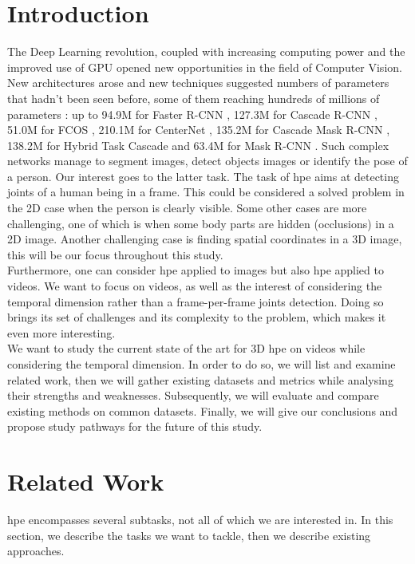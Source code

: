 \documentclass[runningheads]{llncs}
\begin{document}
\section{Introduction}
\label{section: introduction}
The Deep Learning revolution, coupled with increasing computing power and the improved use of GPU opened new opportunities in the field of Computer Vision. New architectures arose and new techniques suggested numbers of parameters that hadn't been seen before, some of them reaching hundreds of millions of parameters \cite{hrnet}: up to 94.9M for Faster R-CNN \cite{R-CNN}, 127.3M for Cascade R-CNN \cite{Cascade R-CNN}, 51.0M for FCOS \cite{FCOS}, 210.1M for CenterNet \cite{CenterNet}, 135.2M for Cascade Mask R-CNN \cite{Cascade R-CNN}, 138.2M for Hybrid Task Cascade \cite{Hybrid Task Cascade} and 63.4M for Mask R-CNN \cite{R-CNN}. Such complex networks manage to segment images, detect objects images or identify the pose of a person. Our interest goes to the latter task. The task of \ac{hpe} aims at detecting joints of a human being in a frame. This could be considered a solved problem in the 2D case when the person is clearly visible. Some other cases are more challenging, one of which is when some body parts are hidden (occlusions) in a 2D image. Another challenging case is finding spatial coordinates in a 3D image, this will be our focus throughout this study. \\
Furthermore, one can consider \ac{hpe} applied to images but also \ac{hpe} applied to videos. We want to focus on videos, as well as the interest of considering the temporal dimension rather than a frame-per-frame joints detection. Doing so brings its set of challenges and its complexity to the problem, which makes it even more interesting. \\
We want to study the current state of the art for 3D \ac{hpe} on videos while considering the temporal dimension. In order to do so, we will list and examine related work, then we will gather existing datasets and metrics while analysing their strengths and weaknesses. Subsequently, we will evaluate and compare existing methods on common datasets. Finally, we will give our conclusions and propose study pathways for the future of this study.

\section{Related Work}
\ac{hpe} encompasses several subtasks, not all of which we are interested in. In this section, we describe the tasks we want to tackle, then we describe existing approaches.
\end{document}
